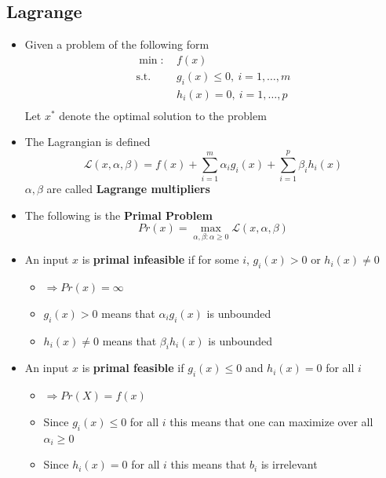 \documentclass[a4, english]{article}
\begin{document}
\subsection{Lagrange}
\begin{itemize}
	\item Given a problem of the following form
\begin{equation*}
  \begin{split} 
          \min: \ & f(x)\\
    \text{s.t.} \ & g_i(x) \leq 0, \ i=1,\dots,m\\
                  & h_i(x) = 0 , \ i=1,\dots,p\\
  \end{split}
\end{equation*}
  Let $x^*$ denote the optimal solution to the problem
  \item The Lagrangian is defined
\begin{equation*}
  \mathcal L(x,\alpha, \beta) = f(x) + \sum_{i=1}^m \alpha_ig_i(x) + \sum_{i=1}^p \beta_i h_i(x)
\end{equation*} 
  $\alpha, \beta$ are called \textbf{Lagrange multipliers}
  \item The following is the \textbf{Primal Problem}
\begin{equation*}
  Pr(x) = \max_{\alpha, \beta: \alpha \geq 0} \mathcal L (x,\alpha, \beta)
\end{equation*}
  	\item An input $x$ is \textbf{primal infeasible} if for some $i$, $g_i(x) >0$ or $h_i(x) \ne 0$ 
  \begin{itemize}
    \item $\Rightarrow Pr(x) = \infty$
    \item $g_i(x) > 0$ means that $\alpha_i g_i(x)$ is unbounded
    \item $h_i(x) \ne 0$ means that $\beta_i h_i(x)$ is unbounded
  \end{itemize}
  \item An input $x$ is \textbf{primal feasible} if $g_i(x) \leq 0$ and $h_i(x) = 0$ for all $i$ 
  \begin{itemize}
    \item $\Rightarrow Pr(X) = f(x)$ 
    \item Since $g_i(x) \leq 0$ for all $i$ this means that one can maximize over all $\alpha_i \geq 0$ 
    \item Since $h_i(x) = 0$ for all $i$ this means that $b_i$ is irrelevant
  \end{itemize}

\end{itemize}
\end{document}
